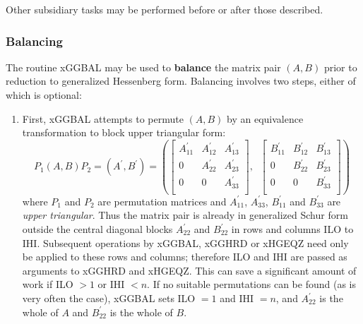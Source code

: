 Other subsidiary tasks may be performed before or after
those described.

\subsubsection{Balancing}

The routine xGGBAL 
may be used to {\bf balance} the matrix pair $(A,B)$
prior to reduction to generalized Hessenberg form.
Balancing involves two steps, either of which is optional:

\begin{enumerate}

\item First, xGGBAL attempts to permute  $(A,B)$
      by an equivalence transformation
      to block upper triangular form:
      \[ P_1(A,B)P_2 = (A^\prime,B^\prime) = \left(
        \left[
        \begin{array}{ccc}
          A^\prime_{11} & A^\prime_{12} & A^\prime_{13} \\
          0             & A^\prime_{22} & A^\prime_{23} \\
          0             &      0        & A^\prime_{33} \\
        \end{array}\right],\;\;
        \left[
        \begin{array}{ccc}
          B^\prime_{11} & B^\prime_{12} & B^\prime_{13} \\
          0             & B^\prime_{22} & B^\prime_{23} \\
          0             &      0        & B^\prime_{33} \\
        \end{array}  \right]
        \right)
      \]
      where $P_1$ and $P_2$ are permutation matrices and $A^\prime_{11}$,
      $A^\prime_{33}$, $B^\prime_{11}$ and $B^\prime_{33}$ are {\it upper
      triangular}.  Thus the matrix pair is already in generalized Schur
      form outside the central diagonal blocks $A^\prime_{22}$ and
      $B^\prime_{22}$ in rows and columns ILO to IHI.  Subsequent operations
      by xGGBAL, xGGHRD or xHGEQZ need only be applied to these rows and
      columns; therefore ILO and IHI are passed as arguments to xGGHRD and
      xHGEQZ.  This can save a significant amount of work if ILO $> 1$
      or IHI $< n$.  If no suitable permutations can be found (as is very
      often the case), xGGBAL sets ILO $= 1$ and IHI $= n$, and
      $A^\prime_{22}$ is the whole of $A$ and $B^\prime_{22}$ is the whole
      of $B$.


\end{enumerate}
